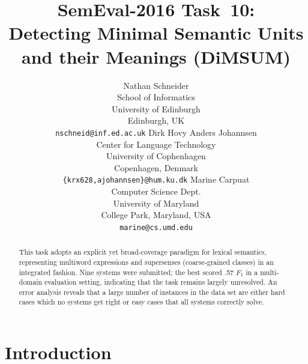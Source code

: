 \documentclass[11pt,letterpaper]{article}
\title{SemEval-2016 Task~10:\\ Detecting Minimal Semantic Units and their Meanings (DiMSUM)}
\author{
Nathan Schneider \\
		School of Informatics\\
	   	University of Edinburgh\\
	    Edinburgh, UK\\
	    {\tt nschneid@inf.ed.ac.uk} \And
Dirk Hovy \quad Anders Johannsen\\
Center for Language Technology\\
University of Cophenhagen\\
Copenhagen, Denmark\\
{\tt \{krx628,ajohannsen\}@hum.ku.dk} \And
Marine Carpuat\\
Computer Science Dept.\\
University of Maryland\\
College Park, Maryland, USA\\
{\tt marine@cs.umd.edu}}
\date{}
\newcommand{\ensuretext}[1]{#1}
\newcommand{\nssmarker}{\ensuretext{\textcolor{magenta}{\ensuremath{^{\textsc{NS}}_{\textsc{S}}}}}}
\newcommand{\dhmarker}{\ensuretext{\textcolor{red}{\ensuremath{^{\textsc{D}}_{\textsc{H}}}}}}
\newcommand{\arkcomment}[3]{\ensuretext{\textcolor{#3}{[#1 #2]}}}
\newcommand{\nss}[1]{\arkcomment{\nssmarker}{#1}{magenta}}
\newcommand{\dirk}[1]{\arkcomment{\dhmarker}{#1}{red}}
\newcommand{\longversion}[1]{#1} %
\begin{document}
\naaclfinalcopy %
\maketitle

\begin{abstract}
This task adopts an explicit yet broad-coverage paradigm for lexical semantics, representing
multiword expressions and supersenses (coarse-grained classes) in an integrated fashion.
Nine systems were submitted; the best scored .57 $F_1$ in a multi-domain evaluation setting, 
indicating that the task remains largely unresolved. 
An error analysis reveals that a large number of instances in the data set are either hard cases 
which no systems get right or easy cases that all systems correctly solve.
\end{abstract}

\section{Introduction}\label{sec:intro}


\end{document}
